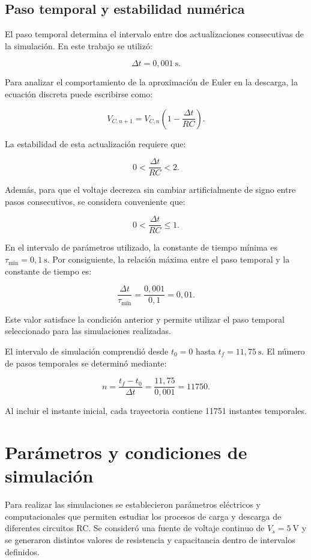 \documentclass[11pt,a4paper]{article}
\begin{document}
\subsection{Paso temporal y estabilidad numérica}

El paso temporal determina el intervalo entre dos
actualizaciones consecutivas de la simulación. En este trabajo
se utilizó:

\[
\Delta t=0,001\ \text{s}.
\]

Para analizar el comportamiento de la aproximación de Euler
en la descarga, la ecuación discreta puede escribirse como:

\[
V_{C,n+1}=V_{C,n}
\left(1-\frac{\Delta t}{RC}\right).
\]

La estabilidad de esta actualización requiere que:

\[
0<\frac{\Delta t}{RC}<2.
\]

Además, para que el voltaje decrezca sin cambiar artificialmente
de signo entre pasos consecutivos, se considera conveniente
que:

\[
0<\frac{\Delta t}{RC}\leq1.
\]

En el intervalo de parámetros utilizado, la constante de tiempo
mínima es $\tau_{\min}=0,1\ \text{s}$. Por consiguiente, la
relación máxima entre el paso temporal y la constante de tiempo
es:

\[
\frac{\Delta t}{\tau_{\min}}
=
\frac{0,001}{0,1}
=0,01.
\]

Este valor satisface la condición anterior y permite utilizar
el paso temporal seleccionado para las simulaciones realizadas.

El intervalo de simulación comprendió desde $t_0=0$ hasta
$t_f=11,75\ \text{s}$. El número de pasos temporales se
determinó mediante:

\[
n=\frac{t_f-t_0}{\Delta t}
=\frac{11,75}{0,001}
=11750.
\]

Al incluir el instante inicial, cada trayectoria contiene
11751 instantes temporales.



\section{Parámetros y condiciones de simulación}

Para realizar las simulaciones se establecieron parámetros
eléctricos y computacionales que permiten estudiar los procesos
de carga y descarga de diferentes circuitos RC. Se consideró
una fuente de voltaje continuo de $V_s=5\ \text{V}$ y se
generaron distintos valores de resistencia y capacitancia
dentro de intervalos definidos.
\end{document}
